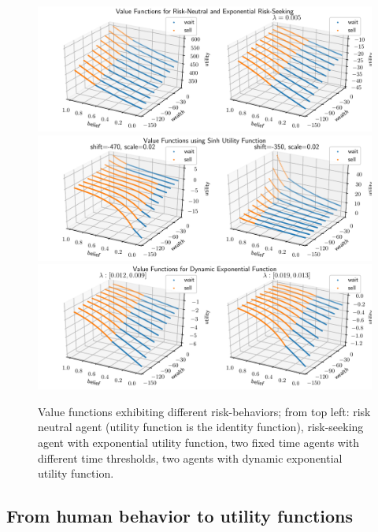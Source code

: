 \begin{figure}[h]
    \centering
    \includegraphics[width=0.99\linewidth]{img/exp_policy.pdf}\\
    \vspace{1cm}
    \includegraphics[width=0.99\linewidth]{img/sinh_policy.pdf}\\
    \vspace{1cm}
    \includegraphics[width=0.99\linewidth]{img/dyn_policy.pdf}
    \caption{Value functions exhibiting different risk-behaviors; from top left: risk neutral agent (utility function is the identity function), risk-seeking agent with exponential utility function, two fixed time agents with different time thresholds, two agents with dynamic exponential utility function.}\label{fig:val-func}
\end{figure}

\subsection{From human behavior to utility functions}\label{ssec:human-behavior}

